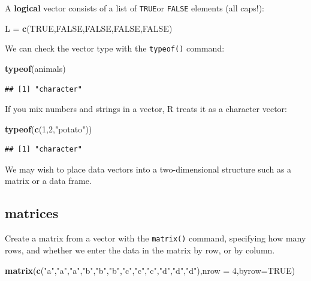 \documentclass[
]{book}
\newenvironment{Shaded}{\begin{snugshade}}{\end{snugshade}}
\newcommand{\AttributeTok}[1]{\textcolor[rgb]{0.13,0.29,0.53}{#1}}
\newcommand{\ConstantTok}[1]{\textcolor[rgb]{0.56,0.35,0.01}{#1}}
\newcommand{\DecValTok}[1]{\textcolor[rgb]{0.00,0.00,0.81}{#1}}
\newcommand{\FunctionTok}[1]{\textcolor[rgb]{0.13,0.29,0.53}{\textbf{#1}}}
\newcommand{\NormalTok}[1]{#1}
\newcommand{\OtherTok}[1]{\textcolor[rgb]{0.56,0.35,0.01}{#1}}
\newcommand{\StringTok}[1]{\textcolor[rgb]{0.31,0.60,0.02}{#1}}
\theoremstyle{definition}
\theoremstyle{definition}
\theoremstyle{definition}
\theoremstyle{definition}
\theoremstyle{remark}
\begin{document}
A \textbf{logical} vector consists of a list of \texttt{TRUE}or \texttt{FALSE} elements (all caps!):

\begin{Shaded}
\begin{Highlighting}[]
\NormalTok{L }\OtherTok{=} \FunctionTok{c}\NormalTok{(}\ConstantTok{TRUE}\NormalTok{,}\ConstantTok{FALSE}\NormalTok{,}\ConstantTok{FALSE}\NormalTok{,}\ConstantTok{FALSE}\NormalTok{,}\ConstantTok{FALSE}\NormalTok{)}
\end{Highlighting}
\end{Shaded}

We can check the vector type with the \texttt{typeof()} command:

\begin{Shaded}
\begin{Highlighting}[]
\FunctionTok{typeof}\NormalTok{(animals)}
\end{Highlighting}
\end{Shaded}

\begin{verbatim}
## [1] "character"
\end{verbatim}

If you mix numbers and strings in a vector, R treats it as a character vector:

\begin{Shaded}
\begin{Highlighting}[]
\FunctionTok{typeof}\NormalTok{(}\FunctionTok{c}\NormalTok{(}\DecValTok{1}\NormalTok{,}\DecValTok{2}\NormalTok{,}\StringTok{"potato"}\NormalTok{))}
\end{Highlighting}
\end{Shaded}

\begin{verbatim}
## [1] "character"
\end{verbatim}

We may wish to place data vectors into a two-dimensional structure such as a matrix or a data frame.

\subsection*{matrices}\label{matrices}

Create a matrix from a vector with the \texttt{matrix()} command, specifying how many rows, and whether we enter the data in the matrix by row, or by column.

\begin{Shaded}
\begin{Highlighting}[]
\FunctionTok{matrix}\NormalTok{(}\FunctionTok{c}\NormalTok{(}\StringTok{"a"}\NormalTok{,}\StringTok{"a"}\NormalTok{,}\StringTok{"a"}\NormalTok{,}\StringTok{"b"}\NormalTok{,}\StringTok{"b"}\NormalTok{,}\StringTok{"b"}\NormalTok{,}\StringTok{"c"}\NormalTok{,}\StringTok{"c"}\NormalTok{,}\StringTok{"c"}\NormalTok{,}\StringTok{"d"}\NormalTok{,}\StringTok{"d"}\NormalTok{,}\StringTok{"d"}\NormalTok{),}\AttributeTok{nrow =} \DecValTok{4}\NormalTok{,}\AttributeTok{byrow=}\ConstantTok{TRUE}\NormalTok{)}
\end{Highlighting}
\end{Shaded}
\end{document}

